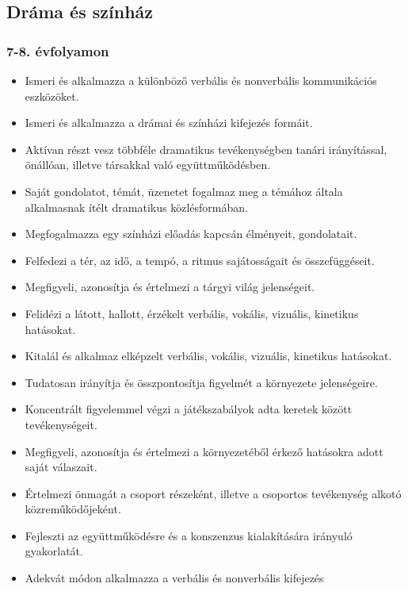 \hypertarget{drama-es-szinhaz}{%
\subsection{Dráma és színház}\label{drama-es-szinhaz}}

\hypertarget{evfolyamon-6}{%
\subsubsection{7-8. évfolyamon}\label{evfolyamon-6}}

\begin{itemize}
\item
  Ismeri és alkalmazza a különböző verbális és nonverbális kommunikációs
  eszközöket.
\item
  Ismeri és alkalmazza a drámai és színházi kifejezés formáit.
\item
  Aktívan részt vesz többféle dramatikus tevékenységben tanári
  irányítással, önállóan, illetve társakkal való együttműködésben.
\item
  Saját gondolatot, témát, üzenetet fogalmaz meg a témához általa
  alkalmasnak ítélt dramatikus közlésformában.
\item
  Megfogalmazza egy színházi előadás kapcsán élményeit, gondolatait.
\item
  Felfedezi a tér, az idő, a tempó, a ritmus sajátosságait és
  összefüggéseit.
\item
  Megfigyeli, azonosítja és értelmezi a tárgyi világ jelenségeit.
\item
  Felidézi a látott, hallott, érzékelt verbális, vokális, vizuális,
  kinetikus hatásokat.
\item
  Kitalál és alkalmaz elképzelt verbális, vokális, vizuális, kinetikus
  hatásokat.
\item
  Tudatosan irányítja és összpontosítja figyelmét a környezete
  jelenségeire.
\item
  Koncentrált figyelemmel végzi a játékszabályok adta keretek között
  tevékenységeit.
\item
  Megfigyeli, azonosítja és értelmezi a környezetéből érkező hatásokra
  adott saját válaszait.
\item
  Értelmezi önmagát a csoport részeként, illetve a csoportos tevékenység
  alkotó közreműködőjeként.
\item
  Fejleszti az együttműködésre és a konszenzus kialakítására irányuló
  gyakorlatát.
\item
  Adekvát módon alkalmazza a verbális és nonverbális kifejezés

\end{itemize}

